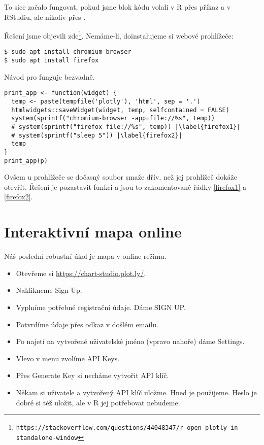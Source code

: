 To sice začalo fungovat, pokud jsme blok kódu volali v R přes příkaz  a v RStudiu, ale nikoliv přes .

Řešení jsme objevili zde\footnote{\texttt{https://stackoverflow.com/questions/44048347/r-open-plotly-in-}\\\texttt{standalone-window}}. Nemáme-li, doinstalujeme si webové prohlížeče:
\begin{lstlisting}[numbers=none]
$ sudo apt install chromium-browser
$ sudo apt install firefox
\end{lstlisting}
\addtocounter{lstnumber}{-2}

Návod pro  funguje bezvadně.

\begin{lstlisting}[escapechar=|]
print_app <- function(widget) {
  temp <- paste(tempfile('plotly'), 'html', sep = '.')
  htmlwidgets::saveWidget(widget, temp, selfcontained = FALSE)
  system(sprintf("chromium-browser -app=file://%s", temp))
  # system(sprintf("firefox file://%s", temp)) |\label{firefox1}|
  # system(sprintf("sleep 5")) |\label{firefox2}|
  temp
}
print_app(p)
\end{lstlisting}

Ovšem u prohlížeče  se dočasný soubor smaže dřív, než jej prohlížeč dokáže otevřít. Řešení je pozastavit funkci  a jsou to zakomentované řádky \ref{firefox1} a \ref{firefox2}.


\section{Interaktivní mapa online}

Náš poslední robustní úkol je mapa v online režimu.
\begin{itemize}
\itemsep=-2pt
\item Otevřeme si \url{https://chart-studio.plot.ly/}.
\item Naklikneme Sign Up. 
\item Vyplníme potřebné registrační údaje. Dáme SIGN UP.
\item Potvrdíme údaje přes odkaz v došlém emailu.
\item Po najetí na vytvořené uživatelské jméno (vpravo nahoře) dáme Settings.
\item Vlevo v menu zvolíme API Keys.
\item Přes Generate Key si necháme vytvořit API klíč.
\item Někam si uživatele a vytvořený API klíč uložme. Hned je použijeme. Heslo je dobré si též uložit, ale v R jej potřebovat nebudeme.
\end{itemize}

